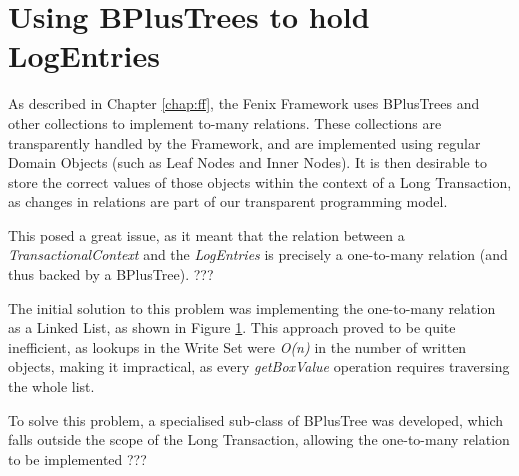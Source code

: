 \section{Using BPlusTrees to hold LogEntries}

As described in Chapter \ref{chap:ff}, the Fenix Framework uses
BPlusTrees and other collections to implement to-many relations. These
collections are transparently handled by the Framework, and are
implemented using regular Domain Objects (such as Leaf Nodes and Inner
Nodes). It is then desirable to store the correct values of those
objects within the context of a Long Transaction, as changes in
relations are part of our transparent programming model.

This posed a great issue, as it meant that the relation between a {\it
  TransactionalContext} and the {\it LogEntries} is precisely a
one-to-many relation (and thus backed by a BPlusTree). ???

The initial solution to this problem was implementing the one-to-many
relation as a Linked List, as shown in Figure
\ref{fig:linkedList}. This approach proved to be quite inefficient, as
lookups in the Write Set were {\it O(n)} in the number of written
objects, making it impractical, as every {\it getBoxValue} operation
requires traversing the whole list.

\begin{figure}
  \centering

\caption{}
\label{fig:linkedList}
\end{figure}

To solve this problem, a specialised sub-class of BPlusTree was
developed, which falls outside the scope of the Long Transaction,
allowing the one-to-many relation to be implemented ???

